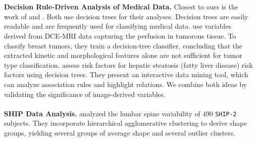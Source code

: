 \documentclass[a4paper,twoside]{style/article}
\begin{document}
\\\\
\noindent \textbf{Decision Rule-Driven Analysis of Medical Data.}
Closest to ours is the work of \cite{Glasser2013} and \cite{Niemann2014}.
Both use decision trees for their analyses.
Decision trees are easily readable and are frequently used for classifying medical data.
\cite{Glasser2013} use variables derived from DCE-MRI data capturing the perfusion in tumorous tissue.
To classify breast tumors, they train a decision-tree classifier, concluding that the extracted kinetic and morphological features alone are not sufficient for tumor type classification.
\cite{Niemann2014} assess risk factors for hepatic steatosis (fatty liver disease) risk factors using decision trees.
They present an interactive data mining tool, which can analyze association rules and highlight relations. %
We combine both ideas by validating the significance of image-derived variables.
\\\\
\noindent \textbf{SHIP Data Analysis.}
\cite{Klemm2013VMV} analyzed the lumbar spine variability of 490 \texttt{SHIP-2} subjects.
They incorporate hierarchical agglomerative clustering to derive shape groups, yielding several groups of average shape and several outlier clusters.
\end{document}
